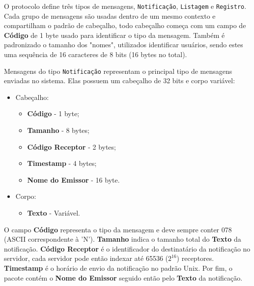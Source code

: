 \documentclass[12pt]{article}
\begin{document}
O protocolo define três tipos de mensagens,
{\tt Notificação}, {\tt Listagem} e {\tt Registro}.
Cada grupo de mensagens são usadas dentro de um mesmo contexto e compartilham o padrão de cabeçalho,
todo cabeçalho começa com um campo de {\bf Código} de 1 byte usado para identificar o tipo da mensagem.
Também é padronizado o tamanho dos "nomes", utilizados identificar usuários,
sendo estes uma sequência de 16 caracteres de 8 bits (16 bytes no total).

Mensagens do tipo {\tt Notificação} representam o principal tipo de mensagens enviadas no sistema.
Elas possuem um cabeçalho de 32 bits e corpo variável:
\begin{itemize}
\item Cabeçalho:
	\begin{itemize}
	\item {\bf Código} - 1 byte;
	\item {\bf Tamanho} - 8 bytes;
	\item {\bf Código Receptor} - 2 bytes;
	\item {\bf Timestamp} - 4 bytes;
	\item {\bf Nome do Emissor} - 16 byte.
	\end{itemize}
\item Corpo:
	\begin{itemize}
	\item {\bf Texto} - Variável.
	\end{itemize}
\end{itemize}
O campo {\bf Código} representa o tipo da mensagem e deve sempre conter 078 (ASCII correspondente à 'N').
{\bf Tamanho} indica o tamanho total do {\bf Texto} da notificação.
{\bf Código Receptor} é o identificador do destinatário da notificação no servidor,
cada servidor pode então indexar até 65536 ($2^{16}$) receptores.
{\bf Timestamp} é o horário de envio da notificação no padrão Unix.
Por fim, o pacote contém o {\bf Nome do Emissor} seguido então pelo {\bf Texto} da notificação.
\end{document}
